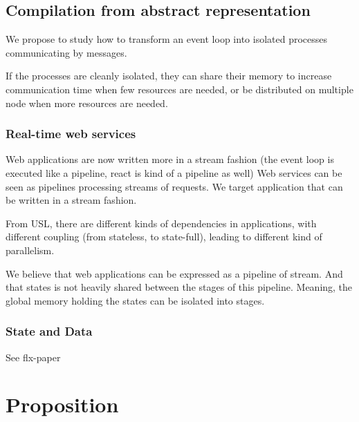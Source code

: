 \subsection{Compilation from abstract representation}

We propose to study how to transform an event loop into isolated processes communicating by messages.

If the processes are cleanly isolated, they can share their memory to increase communication time when few resources are needed, or be distributed on multiple node when more resources are needed.

\subsubsection{Real-time web services}

Web applications are now written more in a stream fashion (the event loop is executed like a pipeline, react is kind of a pipeline as well)
Web services can be seen as pipelines processing streams of requests.
We target application that can be written in a stream fashion.

From USL, there are different kinds of dependencies in applications, with different coupling (from stateless, to state-full), leading to different kind of parallelism.

We believe that web applications can be expressed as a pipeline of stream.
And that states is not heavily shared between the stages of this pipeline.
Meaning, the global memory holding the states can be isolated into stages.

\subsubsection{State and Data}

See flx-paper


\section{Proposition}




\endinput





